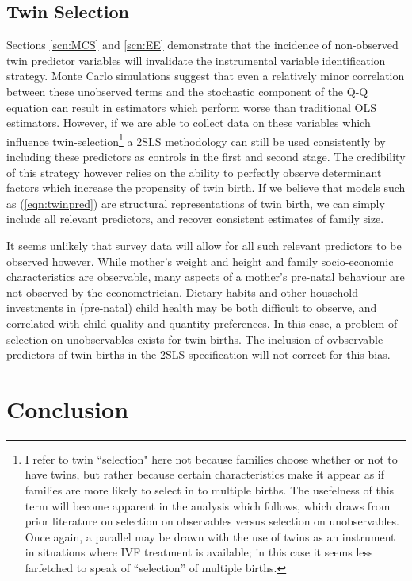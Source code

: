 \documentclass{article}[11pt,subeqn]
\begin{document}
\begin{spacing}{1.25}
\subsection{Twin Selection}
Sections \ref{scn:MCS} and \ref{scn:EE} demonstrate that the incidence of non-observed twin predictor variables will invalidate the instrumental variable identification strategy.  Monte Carlo simulations suggest that even a relatively minor correlation between these unobserved terms and the stochastic component of the Q-Q equation can result in estimators which perform worse than traditional OLS estimators.  However, if we are able to collect data on these variables which influence twin-selection\footnote{I refer to twin ``selection" here not because families choose whether or not to have twins, but rather because certain characteristics make it appear as if families are more likely to select in to multiple births.  The usefelness of this term will become apparent in the analysis which follows, which draws from prior literature on selection on observables versus selection on unobservables.  Once again, a parallel may be drawn with the use of twins as an instrument in situations where IVF treatment is available; in this case it seems less farfetched to speak of ``selection'' of multiple births.} a 2SLS methodology can still be used consistently by including these predictors as controls in the first and second stage.  The credibility of this strategy however relies on the ability to perfectly observe determinant factors which increase the propensity of twin birth.  If we believe that models such as (\ref{eqn:twinpred}) are structural representations of twin birth, we can simply include all relevant predictors, and recover consistent estimates of family size.

It seems unlikely that survey data will allow for all such relevant predictors to be observed however.  While mother's weight and height and family socio-economic characteristics are observable, many aspects of a mother's pre-natal behaviour are not observed by the econometrician.  Dietary habits and other household investments in (pre-natal) child health may be both difficult to observe, and correlated with child quality and quantity preferences.  In this case, a problem of selection on unobservables exists for twin births.  The inclusion of ovbservable predictors of twin births in the 2SLS specification will not correct for this bias.

 



\section{Conclusion}


\end{spacing}
\end{document}
